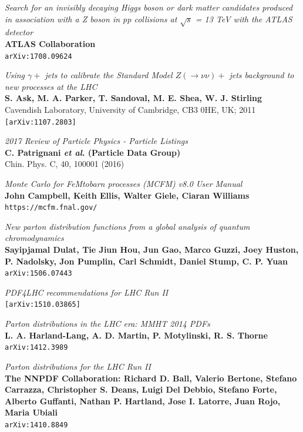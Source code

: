 \documentclass[11pt,a4paper]{report}
\begin{document}
\begin{thebibliography}{9}

	\textit{Search for an invisibly decaying Higgs boson or dark matter candidates produced in association with a Z boson in pp collisions at $\sqrt{s}$ = 13 TeV with the ATLAS detector}\\
	\textbf{ATLAS Collaboration}\\
	\texttt{arXiv:1708.09624}
	
	\textit{Using $\gamma +$ jets to calibrate the Standard Model $Z(\rightarrow \nu\nu)+$ jets background to new processes at the LHC}\\
	\textbf{S. Ask, M. A. Parker, T. Sandoval, M. E. Shea, W. J. Stirling}\\
Cavendish Laboratory, University of Cambridge, CB3 0HE, UK; 2011\\
	\texttt{[arXiv:1107.2803]}

	\textit{2017 Review of Particle Physics - Particle Listings}\\
	\textbf{C. Patrignani \textit{et al}. (Particle Data Group)}\\
	Chin. Phys. C, 40, 100001 (2016)
	
	\textit{Monte Carlo for FeMtobarn processes (MCFM) v8.0 User Manual}\\
	\textbf{John Campbell, Keith Ellis, Walter Giele, Ciaran Williams}\\
	\texttt{https://mcfm.fnal.gov/}
	
	\textit{New parton distribution functions from a global analysis of quantum chromodynamics}\\
	\textbf{Sayipjamal Dulat, Tie Jiun Hou, Jun Gao, Marco Guzzi, Joey Huston, P. Nadolsky, Jon Pumplin, Carl Schmidt, Daniel Stump, C. P. Yuan}\\
	\texttt{arXiv:1506.07443}

	\textit{PDF4LHC recommendations for LHC Run II}\\
	\texttt{[arXiv:1510.03865]}	
	
	\textit{Parton distributions in the LHC era: MMHT 2014 PDFs}\\
	\textbf{L. A. Harland-Lang, A. D. Martin, P. Motylinski, R. S. Thorne}\\
	\texttt{arXiv:1412.3989}
	
	\textit{Parton distributions for the LHC Run II}\\
	\textbf{The NNPDF Collaboration: Richard D. Ball, Valerio Bertone, Stefano Carrazza, Christopher S. Deans, Luigi Del Debbio, Stefano Forte, Alberto Guffanti, Nathan P. Hartland, Jose I. Latorre, Juan Rojo, Maria Ubiali}\\
	\texttt{arXiv:1410.8849}
	

\end{thebibliography}
\end{document}
